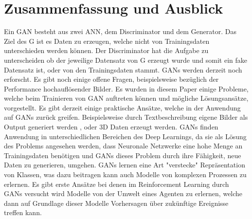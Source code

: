 \documentclass{llncs}
\begin{document}
\section{Zusammenfassung und Ausblick}
Ein GAN besteht aus zwei ANN, dem Discriminator und dem Generator. Das Ziel des G ist es Daten zu erzeugen, welche nicht von Trainingsdaten unterschieden werden können. Der Discriminator hat die Aufgabe zu unterscheiden ob der jeweilige Datensatz von G erzeugt wurde und somit ein fake Datensatz ist, oder von den Trainingsdaten stammt\cite{goodfellow2014}. GANs werden derzeit noch erforscht. Es gibt noch einige offene Fragen, beispielsweise bezüglich der Performance hochauflösender Bilder\cite{ende}. Es wurden in diesem Paper einige Probleme, welche beim Trainieren von GAN auftreten können und mögliche Lösungsansätze, vorgestellt. Es gibt derzeit einige praktische Ansätze, welche in der Anwendung auf GANs zurück greifen. Beispielsweise durch Textbeschreibung eigene Bilder als Output generiert werden \cite{texttoimage}, oder 3D Daten erzeugt werden\cite{3dgan}. GANs finden Anwendung in unterschiedlichen Bereichen des Deep Learnings, da sie als Lösung des Problems angesehen werden, dass Neuronale Netzwerke eine hohe Menge an Trainingsdaten benötigen und GANs dieses Problem durch ihre Fähigkeit, neue Daten zu generieren, umgehen. GANs lernen eine Art "verstecke" Repräsentation von Klassen, was dazu beitragen kann auch Modelle von komplexen Prozessen zu erlernen. Es gibt erste Ansätze bei denen im Reinforcement Learning durch GANs versucht wird Modelle von der Umwelt eines Agenten zu erlernen, welche dann auf Grundlage dieser Modelle Vorhersagen über zukünftige Ereignisse treffen kann\cite{reinforcment}.
\newpage
\listoffigures
\newpage
\tableofcontents
\newpage
\listoftables
\newpage


\end{document}
